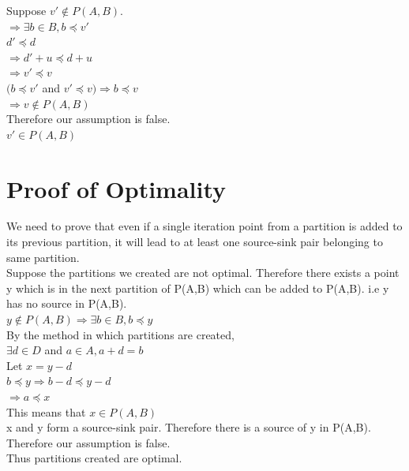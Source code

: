 Suppose $v' \notin P(A,B)$. \\
$ \Rightarrow \exists b \in B, b \preceq v'$ \\
$ d' \preceq d $ \\
$ \Rightarrow d' + u \preceq d + u $ \\
$ \Rightarrow v' \preceq v$ \\
$ (b \preceq v'$ and $v' \preceq v) \Rightarrow b \preceq v$ \\ 
$ \Rightarrow v \notin P(A, B)$ \\
Therefore our assumption is false. \\
$v' \in P(A,B)$ \\

\section{Proof of Optimality}
We need to prove that even if a single iteration point from a partition is added to its previous partition, it will lead to at least one source-sink pair belonging to same partition. \\

Suppose the partitions we created are not optimal. 
Therefore there exists a point y which is in the next partition of P(A,B) which can be added to P(A,B). i.e y has no source in P(A,B). \\

\noindent $y \notin P(A,B) \Rightarrow  \exists b \in B, b \preceq y$ \\
By the method in which partitions are created, \\
$ \exists d \in D$ and $a \in A, a + d = b$ \\
Let $x = y - d$ \\
$ b \preceq y \Rightarrow b - d \preceq y - d$ \\
$ \Rightarrow a \preceq x$ \\
This means that $x \in P(A,B)$ \\
x and y form a source-sink pair. Therefore there is a source of y in P(A,B).
Therefore our assumption is false. \\

Thus partitions created are optimal.\\